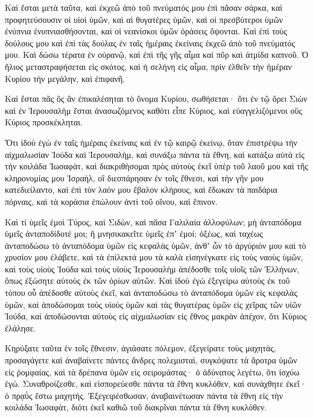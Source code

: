 \begin{spacing}{1.1}
\begin{multicols}{2}
Καὶ ἔσται μετὰ ταῦτα, καὶ ἐκχεῶ ἀπὸ τοῦ πνεύματός μου ἐπὶ πᾶσαν σάρκα, καὶ προφητεύσουσιν οἱ υἱοὶ ὑμῶν, καὶ αἱ θυγατέρες ὑμῶν, καὶ οἱ πρεσβύτεροι ὑμῶν ἐνύπνια ἐνυπνιασθήσονται, καὶ οἱ νεανίσκοι ὑμῶν ὁράσεις ὄψονται.
Καὶ ἐπὶ τοὺς δούλους μου καὶ ἐπὶ τὰς δούλας ἐν ταῖς ἡμέραις ἐκείναις ἐκχεῶ ἀπὸ τοῦ πνεύματός μου.
Καὶ δώσω τέρατα ἐν οὐρανῷ, καὶ ἐπὶ τῆς γῆς αἷμα καὶ πῦρ καὶ ἀτμίδα καπνοῦ.
Ὁ ἥλιος μεταστραφήσεται εἰς σκότος, καὶ ἡ σελήνη εἰς αἷμα, πρὶν ἐλθεῖν τὴν ἡμέραν Κυρίου τὴν μεγάλην, καὶ ἐπιφανῆ.

Καὶ ἔσται πᾶς ὃς ἂν ἐπικαλέσηται τὸ ὄνομα Κυρίου, σωθήσεται· ὅτι ἐν τῷ ὄρει Σιὼν καὶ ἐν Ἱερουσαλὴμ ἔσται ἀνασωζόμενος καθότι εἶπε Κύριος, καὶ εὐαγγελιζόμενοι οὓς Κύριος προσκέκληται.

Ὅτι ἰδοὺ ἐγὼ ἐν ταῖς ἡμέραις ἐκείναις καὶ ἐν τῷ καιρῷ ἐκείνῳ, ὅταν ἐπιστρέψω τὴν αἰχμαλωσίαν Ἰούδα καὶ Ἱερουσαλὴμ,
καὶ συνάξω πάντα τὰ ἔθνη, καὶ κατάξω αὐτὰ εἰς τὴν κοιλάδα Ἰωσαφὰτ, καὶ διακριθήσομαι πρὸς αὐτοὺς ἐκεῖ ὑπὲρ τοῦ λαοῦ μου καὶ τῆς κληρονομίας μου Ἰσραὴλ, οἳ διεσπάρησαν ἐν τοῖς ἔθνεσι, καὶ τὴν γῆν μου κατεδιείλαντο,
καὶ ἐπὶ τὸν λαόν μου ἔβαλον κλήρους, καὶ ἔδωκαν τὰ παιδάρια πόρναις, καὶ τὰ κοράσια ἐπώλουν ἀντὶ τοῦ οἴνου, καὶ ἔπινον.

Καὶ τί ὑμεῖς ἐμοὶ Τύρος, καὶ Σιδὼν, καὶ πᾶσα Γαλιλαία ἀλλοφύλων; μὴ ἀνταπόδομα ὑμεῖς ἀνταποδίδοτέ μοι; ἢ μνησικακεῖτε ὑμεῖς ἐπʼ ἐμοί; ὀξέως, καὶ ταχέως ἀνταποδώσω τὸ ἀνταπόδομα ὑμῶν εἰς κεφαλὰς ὑμῶν,
ἀνθʼ ὧν τὸ ἀργύριόν μου καὶ τὸ χρυσίον μου ἐλάβετε, καὶ τὰ ἐπίλεκτά μου τὰ καλὰ εἰσηνέγκατε εἰς τοὺς ναοὺς ὑμῶν,
καὶ τοὺς υἱοὺς Ἰούδα καὶ τοὺς υἱοὺς Ἱερουσαλὴμ ἀπέδοσθε τοῖς υἱοῖς τῶν Ἑλλήνων, ὅπως ἐξώσητε αὐτοὺς ἐκ τῶν ὁρίων αὐτῶν.
Καὶ ἰδοὺ ἐγὼ ἐξεγείρω αὐτοὺς ἐκ τοῦ τόπου οὗ ἀπέδοσθε αὐτοὺς ἐκεῖ, καὶ ἀνταποδώσω τὸ ἀνταπόδομα ὑμῶν εἰς κεφαλὰς ὑμῶν,
καὶ ἀποδώσομαι τοὺς υἱοὺς ὑμῶν καὶ τὰς θυγατέρας ὑμῶν εἰς χεῖρας τῶν υἱῶν Ἰούδα, καὶ ἀποδώσονται αὐτοὺς εἰς αἰχμαλωσίαν εἰς ἔθνος μακρὰν ἀπέχον, ὅτι Κύριος ἐλάλησε.

Κηρύξατε ταῦτα ἐν τοῖς ἔθνεσιν, ἁγιάσατε πόλεμον, ἐξεγείρατε τοὺς μαχητὰς, προσαγάγετε καὶ ἀναβαίνετε πάντες ἄνδρες πολεμισταὶ,
συγκόψατε τὰ ἄροτρα ὑμῶν εἰς ῥομφαίας, καὶ τὰ δρέπανα ὑμῶν εἰς σειρομάστας· ὁ ἀδύνατος λεγέτω, ὅτι ἰσχύω ἐγώ.
Συναθροίζεσθε, καὶ εἰσπορεύεσθε πάντα τὰ ἔθνη κυκλόθεν, καὶ συνάχθητε ἐκεῖ· ὁ πρᾳῢς ἔστω μαχητής.
Ἐξεγειρέσθωσαν, ἀναβαινέτωσαν πάντα τὰ ἔθνη εἰς τὴν κοιλάδα Ἰωσαφὰτ, διότι ἐκεῖ καθιῶ τοῦ διακρῖναι πάντα τὰ ἔθνη κυκλόθεν.


\end{multicols}
\end{spacing}
